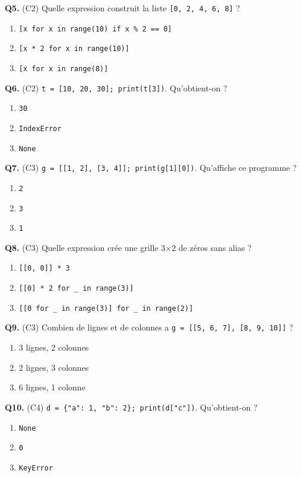 \textbf{Q5.} (C2) Quelle expression construit la liste \lstinline{[0, 2, 4, 6, 8]} ?
\begin{enumerate}[label=\Alph*.]
  \item \lstinline{[x for x in range(10) if x % 2 == 0]}
  \item \lstinline{[x * 2 for x in range(10)]}
  \item \lstinline{[x for x in range(8)]}
\end{enumerate}

\textbf{Q6.} (C2) \lstinline{t = [10, 20, 30]; print(t[3])}. Qu'obtient-on ?
\begin{enumerate}[label=\Alph*.]
  \item \lstinline{30}
  \item \lstinline{IndexError}
  \item \lstinline{None}
\end{enumerate}

\textbf{Q7.} (C3) \lstinline{g = [[1, 2], [3, 4]]; print(g[1][0])}. Qu'affiche ce programme ?
\begin{enumerate}[label=\Alph*.]
  \item \lstinline{2}
  \item \lstinline{3}
  \item \lstinline{1}
\end{enumerate}

\textbf{Q8.} (C3) Quelle expression crée une grille 3$\times$2 de zéros sans alias ?
\begin{enumerate}[label=\Alph*.]
  \item \lstinline{[[0, 0]] * 3}
  \item \lstinline{[[0] * 2 for _ in range(3)]}
  \item \lstinline{[[0 for _ in range(3)] for _ in range(2)]}
\end{enumerate}

\textbf{Q9.} (C3) Combien de lignes et de colonnes a \lstinline{g = [[5, 6, 7], [8, 9, 10]]} ?
\begin{enumerate}[label=\Alph*.]
  \item 3 lignes, 2 colonnes
  \item 2 lignes, 3 colonnes
  \item 6 lignes, 1 colonne
\end{enumerate}

\textbf{Q10.} (C4) \lstinline|d = {"a": 1, "b": 2}; print(d["c"])|. Qu'obtient-on ?
\begin{enumerate}[label=\Alph*.]
  \item \lstinline{None}
  \item \lstinline{0}
  \item \lstinline{KeyError}
\end{enumerate}

